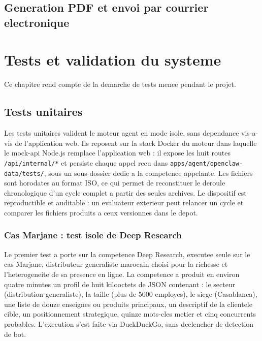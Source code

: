 \documentclass[12pt,a4paper,openany]{report}
\begin{document}

\section{Generation PDF et envoi par courrier electronique}
\label{sec:karamo-pdf-email}


\chapter{Tests et validation du systeme}
\label{chap:tests}

Ce chapitre rend compte de la demarche de tests menee pendant le projet.

\section{Tests unitaires}
\label{sec:tests-unitaires}

Les tests unitaires valident le moteur agent en mode isole, sans dependance vis-a-vis de l'application web. Ils reposent sur la stack Docker du moteur dans laquelle le mock-api Node.js remplace l'application web : il expose les huit routes \texttt{/api/internal/*} et persiste chaque appel recu dans \texttt{apps/agent/openclaw-data/tests/}, sous un sous-dossier dedie a la competence appelante. Les fichiers sont horodates au format ISO, ce qui permet de reconstituer le deroule chronologique d'un cycle complet a partir des seules archives. Le dispositif est reproductible et auditable : un evaluateur exterieur peut relancer un cycle et comparer les fichiers produits a ceux versionnes dans le depot.

\subsection{Cas Marjane : test isole de Deep Research}
\label{sec:test-marjane}

Le premier test a porte sur la competence Deep Research, executee seule sur le cas Marjane, distributeur generaliste marocain choisi pour la richesse et l'heterogeneite de sa presence en ligne. La competence a produit en environ quatre minutes un profil de huit kilooctets de JSON contenant : le secteur (distribution generaliste), la taille (plus de 5000 employes), le siege (Casablanca), une liste de douze enseignes ou produits principaux, un descriptif de la clientele cible, un positionnement strategique, quinze mots-cles metier et cinq concurrents probables. L'execution s'est faite via DuckDuckGo, sans declencher de detection de bot.
\end{document}
